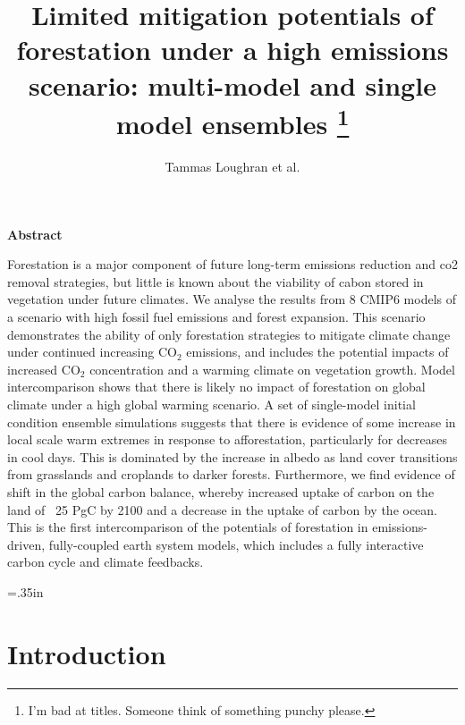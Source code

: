 \documentclass[]{article}
\title{Limited mitigation potentials of forestation under a high emissions scenario: multi-model and single model ensembles \footnote{I'm bad at titles. Someone think of something punchy please.}}
\author{Tammas Loughran et al.}
\begin{document}
\maketitle

\begin{center}
    \Large
    \vspace{0.9cm}
    \textbf{Abstract}
\end{center}

Forestation is a major component of future long-term emissions reduction and co2 removal strategies, but little is known about the viability of cabon stored in vegetation under future climates.
We analyse the results from 8 CMIP6 models of a scenario with high fossil fuel emissions and forest expansion.
This scenario demonstrates the ability of only forestation strategies to mitigate climate change under continued increasing CO$_2$ emissions, and includes the potential impacts of increased CO$_2$ concentration and a warming climate on vegetation growth.
Model intercomparison shows that there is likely no impact of forestation on global climate under a high global warming scenario.
A set of single-model initial condition ensemble simulations suggests that there is evidence of some increase in local scale warm extremes in response to afforestation, particularly for decreases in cool days.
This is dominated by the increase in albedo as land cover transitions from grasslands and croplands to darker forests.
Furthermore, we find evidence of shift in the global carbon balance, whereby increased uptake of carbon on the land of ~25 PgC by 2100 and a decrease in the uptake of carbon by the ocean.
This is the first intercomparison of the potentials of forestation in emissions-driven, fully-coupled earth system models, which includes a fully interactive carbon cycle and climate feedbacks.

\raggedright
\parindent=.35in %

\section{Introduction}
\end{document}
